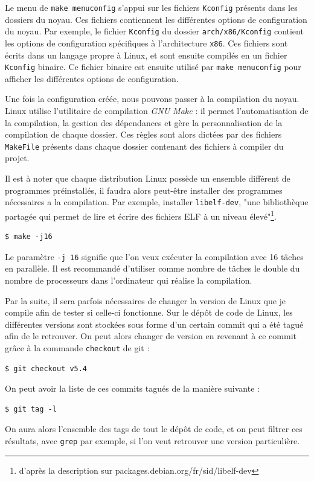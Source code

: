 Le menu de \texttt{make menuconfig} s'appui sur les fichiers \texttt{Kconfig} présents dans les dossiers du noyau. Ces fichiers contiennent les différentes options de configuration du noyau. Par exemple, le fichier \texttt{Kconfig} du dossier \texttt{arch/x86/Kconfig} contient les options de configuration spécifiques à l'architecture \texttt{x86}. Ces fichiers sont écrits dans un langage propre à Linux, et sont ensuite compilés en un fichier \texttt{Kconfig} binaire. Ce fichier binaire est ensuite utilisé par \texttt{make menuconfig} pour afficher les différentes options de configuration. 

Une fois la configuration créée, nous pouvons passer à la compilation du noyau. Linux utilise l'utilitaire de compilation \textit{GNU Make} : il permet l'automatisation de la compilation, la gestion des dépendances et gère la personnalisation de la compilation de chaque dossier. Ces règles sont alors dictées par des fichiers \texttt{MakeFile} présents dans chaque dossier contenant des fichiers à compiler du projet.

Il est à noter que chaque distribution Linux possède un ensemble différent de programmes préinstallés, il faudra alors peut-être installer des programmes nécessaires a la compilation. Par exemple, installer \texttt{libelf-dev}, "une bibliothèque partagée qui permet de lire et écrire des fichiers ELF à un niveau élevé"\footnote{d'après la description sur packages.debian.org/fr/sid/libelf-dev}. 


\newpage %
\begin{lstlisting}[style=command, caption=Compilation sur plusieurs processeurs] 
$ make -j16
\end{lstlisting}

Le paramètre \texttt{-j 16} signifie que l'on veux exécuter la compilation avec 16 tâches en parallèle. Il est recommandé d'utiliser comme nombre de tâches le double du nombre de processeurs dans l'ordinateur qui réalise la compilation.

Par la suite, il sera parfois nécessaires de changer la version de Linux que je compile afin de tester si celle-ci fonctionne. Sur le dépôt de code de Linux, les différentes versions sont stockées sous forme d'un certain commit qui a été tagué afin de le retrouver. On peut alors changer de version en revenant à ce commit grâce à la commande \texttt{checkout} de \gls{git} : 
\begin{lstlisting}[style=command, caption=Retour sur un commit tagé]
$ git checkout v5.4
\end{lstlisting}
On peut avoir la liste de ces commits tagués de la manière suivante : 
\begin{lstlisting}[style=command, caption=Comment lister les tags]
$ git tag -l
\end{lstlisting}
On aura alors l'ensemble des tags de tout le dépôt de code, et on peut filtrer ces résultats, avec \texttt{grep} par exemple, si l'on veut retrouver une version particulière.

